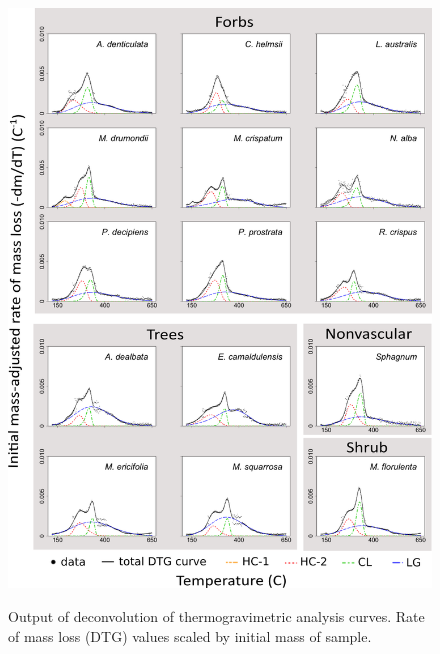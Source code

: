\documentclass{article}
\begin{document}
\begin{figure}
	\ContinuedFloat
	\centering
	{\includegraphics[width=\textwidth]{figs/TGA_fig_other_gfs.png}}
	\caption{Output of deconvolution of thermogravimetric analysis curves. Rate of mass loss (DTG) values scaled by initial mass of sample.}
	\label{Fig:tga_cont}
\end{figure}
\end{document}
